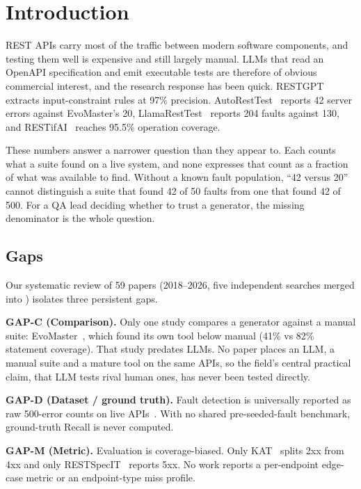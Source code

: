 \section{Introduction}
\label{sec:intro}

REST APIs carry most of the traffic between modern software components, and testing them
well is expensive and still largely manual. LLMs that read an OpenAPI specification and emit
executable tests are therefore of obvious commercial interest, and the research response has
been quick. RESTGPT~\cite{restgpt} extracts input-constraint rules at 97\% precision.
AutoRestTest~\cite{autoresttest} reports 42 server errors against EvoMaster's 20,
LlamaRestTest~\cite{llamaresttest} reports 204 faults against 130, and
RESTifAI~\cite{restifai} reaches 95.5\% operation coverage.

These numbers answer a narrower question than they appear to. Each counts what a suite found
on a live system, and none expresses that count as a fraction of what was available to find.
Without a known fault population, ``42 versus 20'' cannot distinguish a suite that found 42
of 50 faults from one that found 42 of 500. For a QA lead deciding whether to trust a
generator, the missing denominator is the whole question.

\subsection{Gaps}
Our systematic review of 59 papers (2018--2026, five independent searches merged into
) isolates three persistent gaps.

\textbf{GAP-C (Comparison).} Only one study compares a generator against a manual suite:
EvoMaster~\cite{evomaster}, which found its own tool below manual (41\% vs 82\% statement
coverage). That study predates LLMs. No paper places an LLM, a manual suite and a mature tool
on the same APIs, so the field's central practical claim, that LLM tests rival human ones,
has never been tested directly.

\textbf{GAP-D (Dataset / ground truth).} Fault detection is universally reported as raw
500-error counts on live
APIs~\cite{llamaresttest,autoresttest,logiagent,notimetorest,evomaster,morest}. With no
shared pre-seeded-fault benchmark, ground-truth Recall is never computed.

\textbf{GAP-M (Metric).} Evaluation is coverage-biased. Only KAT~\cite{kat} splits 2xx from
4xx and only RESTSpecIT~\cite{restspecit} reports 5xx. No work reports a per-endpoint
edge-case metric or an endpoint-type miss profile.

